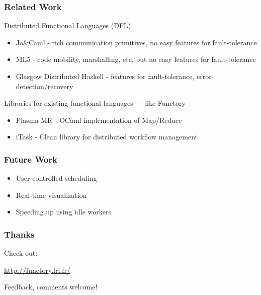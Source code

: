 \documentclass[xcolor=dvipsnames]{beamer}
\begin{document}
\begin{frame}\frametitle {Related Work}
  Distributed Functional Languages (DFL)
  \begin{itemize}
  \item Jo\&Caml - rich communication primitives, no easy features
    for fault-tolerance
  \item ML5 - code mobility, marshalling, etc, but no
    easy features for fault-tolerance
  \item Glasgow Distributed Haskell - features for fault-tolerance,
    error detection/recovery
  \end{itemize}


  Libraries for existing functional languages --- like Functory
  \begin{itemize}
  \item Plasma MR - OCaml implementation of Map/Reduce
  \item iTask - Clean library for distributed workflow management
  \end{itemize}

  
\end{frame}


\begin{frame}\frametitle {Future Work}
  \begin{itemize}
  \item User-controlled scheduling
  \item Real-time visualization 
  \item Speeding up using idle workers
  \end{itemize}
\end{frame}


\begin{frame}\frametitle {Thanks}


Check out:
\begin{center}
 \textcolor{blue}{\url{http://functory.lri.fr/}}  
\end{center}

Feedback, comments welcome!

\end{frame}

\end{document}
